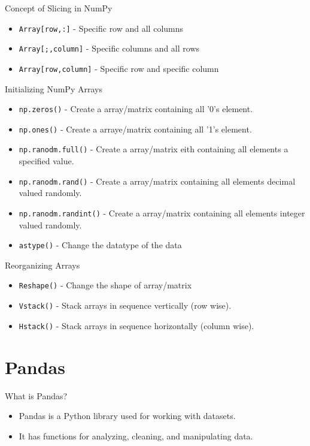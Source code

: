 \documentclass[serif, aspectratio=169]{beamer}
\begin{document}
\begin{frame}{Concept of Slicing in NumPy}
    \begin{itemize}
       \item \texttt{\color{red}Array[row,:]} - Specific row and all columns
       \item \texttt{\color{red}Array[;,column]} - Specific columns and all rows
       \item \texttt{\color{red}Array[row,column]} - Specific row and specific column
    \end{itemize}
\end{frame}

\begin{frame}{Initializing NumPy Arrays}
    \begin{itemize}
       \item \texttt{\color{red}np.zeros()} - Create a array/matrix containing all '0's element.
       \item \texttt{\color{red}np.ones()} - Create a arraye/matrix containing all '1's element.
       \item \texttt{\color{red}np.ranodm.full()} - Create a array/matrix eith containing all elements a specified value.
       \item \texttt{\color{red}np.ranodm.rand()} - Create a array/matrix containing all elements decimal valued randomly.
       \item \texttt{\color{red}np.ranodm.randint()} - Create a array/matrix containing all elements integer valued randomly.
       \item \texttt{\color{red}astype()} - Change the datatype of the data
    \end{itemize}
\end{frame}

\begin{frame}{Reorganizing Arrays}
    \begin{itemize}
       \item \texttt{\color{red}Reshape()} - Change the shape of array/matrix
       \item \texttt{\color{red}Vstack()} - Stack arrays in sequence vertically (row wise).
       \item \texttt{\color{red}Hstack()} - Stack arrays in sequence horizontally (column wise).
    \end{itemize}
\end{frame}

\section{Pandas}
\begin{frame}{What is Pandas?}
    \begin{itemize}
        \item Pandas is a Python library used for working with datasets.
        \item It has functions for analyzing, cleaning, and manipulating data.
    \end{itemize}
\end{frame}
\end{document}

